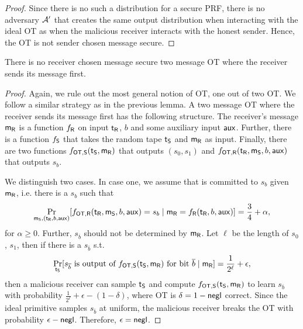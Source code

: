 \begin{proof}
Since there is no such a distribution for a secure PRF, there is no adversary $\mathcal{A}'$ that creates the same output distribution when interacting with the ideal OT as when the malicious receiver interacts with the honest sender. Hence, the OT is not sender chosen message secure. 
\pe
\end{proof}

\begin{lemma}
There is no receiver chosen message secure two message OT where the receiver sends its message first.
\end{lemma}

\begin{proof}
Again, we rule out the most general notion of OT, one out of two OT. We follow a similar strategy as in the previous lemma.
A two message OT where the receiver sends its message first has the following structure. The receiver's message $\mathsf{m}_{\mathsf{R}}$ is a function $f_{\mathsf{R}}$ on input $\mathsf{t}_{\mathsf{R}}$, $b$ and some auxiliary input $\mathsf{aux}$. Further, there is a function $f_{\mathsf{S}}$ that takes the random tape $\mathsf{t}_{\mathsf{S}}$ and $\mathsf{m}_{\mathsf{R}}$ as input. Finally, there are two functions $f_{\mathsf{OT},\mathsf{S}}(\mathsf{t}_{\mathsf{S}},\mathsf{m}_{\mathsf{R}})$ that outputs $(s_0,s_1)$ and $f_{\mathsf{OT},\mathsf{R}}(\mathsf{t}_{\mathsf{R}},\mathsf{m}_{\mathsf{S}},b,\mathsf{aux})$ that outputs $s_b$. 

We distinguish two cases. In case one,  we assume that \rec is committed to $s_b$ given $\mathsf{m}_{\mathsf{R}}$, i.e. there is a $s_b$ such that
$$
\Pr_{\mathsf{m}_{\mathsf{S}}, (\mathsf{t}_{\mathsf{R}},b,\mathsf{aux})}[f_{\mathsf{OT},\mathsf{R}}(\mathsf{t}_{\mathsf{R}},\mathsf{m}_{\mathsf{S}},b,\mathsf{aux})=s_b\mid \mathsf{m}_{\mathsf{R}}=f_{\mathsf{R}}(\mathsf{t}_{\mathsf{R}},b,\mathsf{aux})]=\frac{3}{4}+\alpha,
$$
for $\alpha\geq 0$.
Further, $s_{\overline b}$ should not be determined by $\mathsf{m}_{\mathsf{R}}$. Let $\ell$ be the length of $s_0$, $s_1$, then if there is a $s_{\overline b}$ s.t. 
$$
\Pr_{\mathsf{t}_{\mathsf{S}}}[s_{\overline b}\text{ is output of }f_{\mathsf{OT},\mathsf{S}}(\mathsf{t}_{\mathsf{S}},\mathsf{m}_{\mathsf{R}})\text{ for bit }\overline b\mid \mathsf{m}_{\mathsf{R}}]=\frac{1}{2^\ell}+\epsilon,
$$
then a malicious receiver can sample $\mathsf{t}_{\mathsf{S}}$ and compute $f_{\mathsf{OT},\mathsf{S}}(\mathsf{t}_{\mathsf{S}},\mathsf{m}_{\mathsf{R}})$ to learn $s_{\overline b}$ with probability $\frac{1}{2^\ell}+\epsilon-(1-\delta)$, where OT is $\delta=1-\mathsf{negl}$ correct. Since the ideal primitive samples $s_{\overline b}$ at uniform, the malicious receiver breaks the OT with probability $\epsilon-\mathsf{negl}$. Therefore, $\epsilon=\mathsf{negl}$. 


\end{proof}
